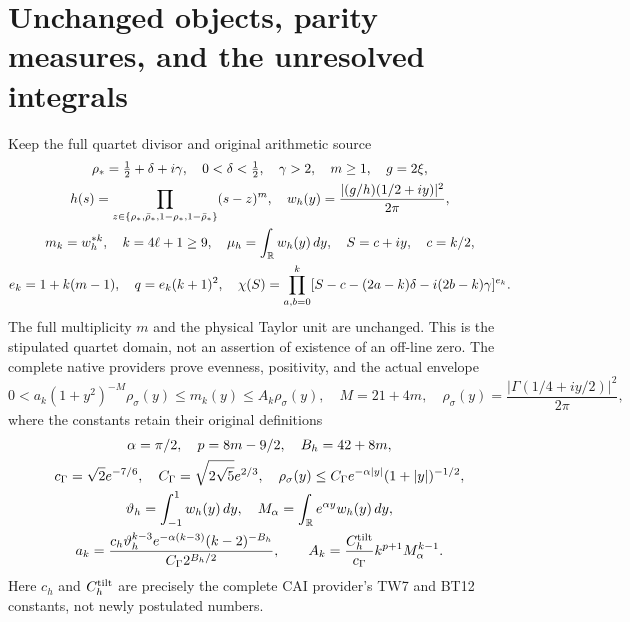 \section{Unchanged objects, parity measures, and the unresolved integrals}

Keep the full quartet divisor and original arithmetic source
\begin{equation}\label{mmnative:eq:native}
 \begin{gathered}
 \rho_*=\tfrac12+\delta+i\gamma,\quad0<\delta<\tfrac12,\quad\gamma>2,
 \quad m\ge1,\quad g=2\xi,\\
 h(s)=\prod_{z\in\{\rho_*,\bar\rho_*,1-\rho_*,1-\bar\rho_*\}}(s-z)^m,
 \quad w_h(y)=\frac{|(g/h)(1/2+iy)|^2}{2\pi},\\
 m_k=w_h^{*k},\quad k=4\ell+1\ge9,\quad
 \mu_h=\int_\mathbb R w_h(y)\,dy,\quad S=c+iy,\quad c=k/2,\\
 e_k=1+k(m-1),\quad q=e_k(k+1)^2,\quad
 \chi(S)=\prod_{a,b=0}^k
 [S-c-(2a-k)\delta-i(2b-k)\gamma]^{e_k}.
 \end{gathered}
\end{equation}
The full multiplicity $m$ and the physical Taylor unit are unchanged.
This is the stipulated quartet domain, not an assertion of existence of
an off-line zero.  The complete native providers \cite{mmnative:CAI,mmnative:HG} prove
evenness, positivity, and the actual envelope
\begin{equation}\label{mmnative:eq:envelope}
 0<a_k(1+y^2)^{-M}\rho_\sigma(y)\le m_k(y)\le A_k\rho_\sigma(y),
 \quad M=21+4m,\quad
 \rho_\sigma(y)=\frac{|\Gamma(1/4+iy/2)|^2}{2\pi},
\end{equation}
where the constants retain their original definitions
\begin{equation}\label{mmnative:eq:constants}
 \begin{gathered}
 \alpha=\pi/2,\quad p=8m-9/2,\quad B_h=42+8m,\\
 c_\Gamma=\sqrt2e^{-7/6},\quad
 C_\Gamma=\sqrt{2\sqrt5}e^{2/3},\quad
 \rho_\sigma(y)\le C_\Gamma e^{-\alpha|y|}(1+|y|)^{-1/2},\\
 \vartheta_h=\int_{-1}^1w_h(y)\,dy,\quad
 M_\alpha=\int_\mathbb R e^{\alpha y}w_h(y)\,dy,\\
 a_k=\frac{c_h\vartheta_h^{k-3}e^{-\alpha(k-3)}(k-2)^{-B_h}}
 {C_\Gamma2^{B_h/2}},\qquad
 A_k=\frac{C_h^{\rm tilt}}{c_\Gamma}k^{p+1}M_\alpha^{k-1}.
 \end{gathered}
\end{equation}
Here $c_h$ and $C_h^{\rm tilt}$ are precisely the complete CAI
provider's TW7 and BT12 constants, not newly postulated numbers.

